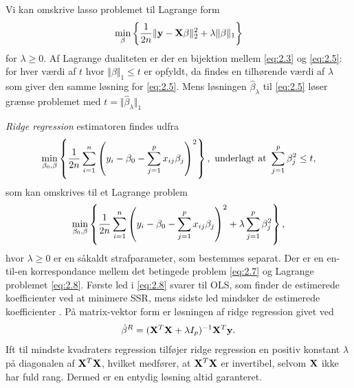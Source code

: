 Vi kan omskrive lasso problemet til Lagrange form
\begin{align}
\min_{\beta} \cbr{\frac{1}{2n} \Vert \y - \X \beta \Vert_2^2 + \lambda \Vert \beta \Vert_1} \label{eq:2.5}
\end{align}
for $\lambda \geq 0$.
Af Lagrange dualiteten er der en bijektion mellem \eqref{eq:2.3} og \eqref{eq:2.5}: for hver værdi af \(t\) hvor \(\Vert \beta \Vert_1 \leq t\) er opfyldt, da findes en tilhørende værdi af $\lambda$ som giver den samme løsning for \eqref{eq:2.5}.
Mens løsningen $\hat{\beta}_\lambda$ til \eqref{eq:2.5} løser grænse problemet med $t=\Vert \hat{\beta}_\lambda \Vert_1$


\textit{Ridge regression} estimatoren findes udfra
\begin{align}
\min_{\beta_0, \beta} \cbr{\frac{1}{2n} \sum_{i=1}^n \del{y_i - \beta_0 - \sum_{j=1}^p x_{ij} \beta_j}^2}, \ \text{underlagt at } \sum_{j=1}^p \beta_j^2 \leq t, \label{eq:2.7}
\end{align}
som kan omskrives til et Lagrange problem
\begin{align}
\min_{\beta_0, \beta} \cbr{\frac{1}{2n} \sum_{i=1}^n \del{y_i - \beta_0 - \sum_{j=1}^p x_{ij} \beta_j}^2 + \lambda \sum_{j=1}^p \beta_j^2},
\end{align} \label{eq:2.8}
hvor $\lambda \geq 0$ er en såkaldt strafparameter, som bestemmes separat.
Der er en en-til-en korrespondance mellem det betingede problem \eqref{eq:2.7} og Lagrange problemet \eqref{eq:2.8}.
Første led i \eqref{eq:2.8} svarer til OLS, som finder de estimerede koefficienter ved at minimere SSR, mens sidste led mindsker de estimerede koefficienter .
På matrix-vektor form er løsningen af ridge regression givet ved
\begin{align*}
\hat{\beta}^R = (\mathbf{X}^T \mathbf{X} + \lambda I_p)^{-1} \mathbf{X}^T \mathbf{y}.
\end{align*} 
Ift til mindste kvadraters regression tilføjer ridge regression en positiv konstant $\lambda$ på diagonalen af $\mathbf{X}^T \mathbf{X}$, hvilket medfører, at \(\mathbf{X}^T \mathbf{X}\) er invertibel, selvom $\mathbf{X}$ ikke har fuld rang.
Dermed er en entydig løsning altid garanteret.


